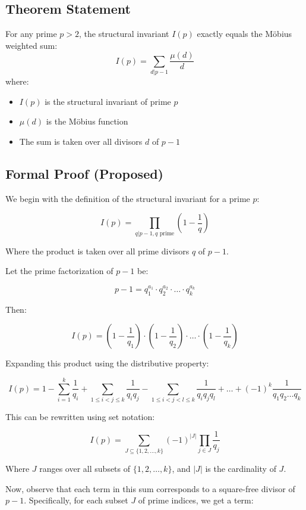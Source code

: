 \documentclass{article}
\begin{document}
\subsection{Theorem Statement}

\begin{theorem}
For any prime $p > 2$, the structural invariant $I(p)$ exactly equals the Möbius weighted sum:
$$I(p) = \sum_{d|p-1} \frac{\mu(d)}{d}$$
where:
\begin{itemize}
\item $I(p)$ is the structural invariant of prime $p$
\item $\mu(d)$ is the Möbius function
\item The sum is taken over all divisors $d$ of $p-1$
\end{itemize}
\end{theorem}

\subsection{Formal Proof (Proposed)}

We begin with the definition of the structural invariant for a prime $p$:

$$I(p) = \prod_{q|p-1, q \text{ prime}} \left(1 - \frac{1}{q}\right)$$

Where the product is taken over all prime divisors $q$ of $p-1$.

Let the prime factorization of $p-1$ be:

$$p-1 = q_1^{a_1} \cdot q_2^{a_2} \cdot \ldots \cdot q_k^{a_k}$$

Then:

$$I(p) = \left(1-\frac{1}{q_1}\right) \cdot \left(1-\frac{1}{q_2}\right) \cdot \ldots \cdot \left(1-\frac{1}{q_k}\right)$$

Expanding this product using the distributive property:

$$I(p) = 1 - \sum_{i=1}^{k} \frac{1}{q_i} + \sum_{1 \leq i < j \leq k} \frac{1}{q_i q_j} - \sum_{1 \leq i < j < l \leq k} \frac{1}{q_i q_j q_l} + \ldots + (-1)^k \frac{1}{q_1 q_2 \ldots q_k}$$

This can be rewritten using set notation:

$$I(p) = \sum_{J \subseteq \{1,2,\ldots,k\}} (-1)^{|J|} \prod_{j \in J} \frac{1}{q_j}$$

Where $J$ ranges over all subsets of $\{1,2,\ldots,k\}$, and $|J|$ is the cardinality of $J$.

Now, observe that each term in this sum corresponds to a square-free divisor of $p-1$. Specifically, for each subset $J$ of prime indices, we get a term:
\end{document}
